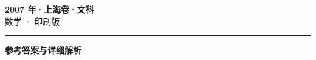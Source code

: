\documentclass[zihao=5, a4paper]{ctexart}
\begin{document}
\begin{center}
  {\Large\bfseries 2007 年·上海卷·文科}\\[4pt]
  {\large 数学 · 印刷版}
\end{center}
\medskip
{}

\par\bigskip\hrule\bigskip
{}
\begin{center}{\large\bfseries 参考答案与详细解析}\end{center}
\smallskip

\end{document}
